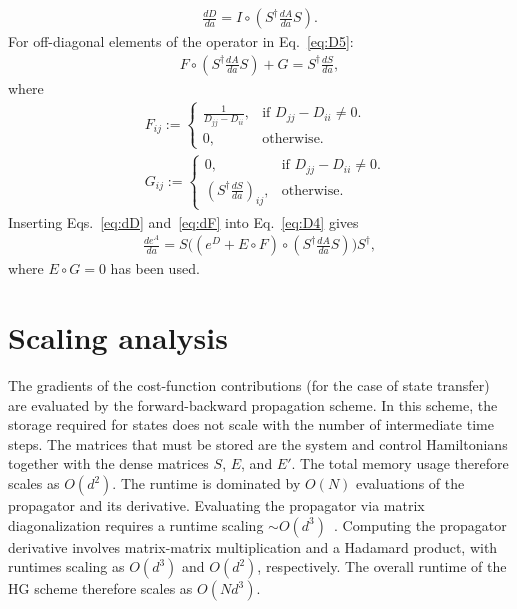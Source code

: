 \begin{appendices}
\begin{align}
\label{eq:dD}
    \frac{dD}{da}=I\circ (S^\dagger\frac{dA}{da}S).
\end{align}
For off-diagonal elements of the operator in Eq.~\eqref{eq:D5}:
\begin{align}
\label{eq:dF}
    F\circ (S^\dagger\frac{dA}{da}S)+G=S^\dagger\frac{dS}{da},
\end{align}
where
\begin{align}
    &F_{ij}:=
  \begin{cases}
    \frac{1}{D_{jj}-D_{ii}},& \text{if $D_{jj}-D_{ii} \neq 0$}.\\
    0, & \text{otherwise}.
  \end{cases}\\
\nonumber  &G_{ij}:=
  \begin{cases}
    0, & \text{if $D_{jj}-D_{ii} \neq 0$}.\\
    (S^\dagger\frac{dS}{da})_{ij}, & \text{otherwise}.
\end{cases}
\end{align}
Inserting Eqs.~\eqref{eq:dD} and~\eqref{eq:dF} into Eq.~\eqref{eq:D4} gives
\begin{align}
\label{eq:propagator_der}
    \frac{de^A}{da}=S\big((e^D+E \circ F)\circ(S^\dagger \frac{dA}{da}S)\big)S^\dagger,
\end{align}
where $E\circ G=0$ has been used.

\section{Scaling analysis}
\label{sec:app_scaling}

The gradients of the cost-function contributions (for the case of state transfer) are evaluated by the forward-backward propagation scheme. In this scheme, the storage required for states does not scale with the number of intermediate time steps. The matrices that must be stored are the system and control Hamiltonians together with the dense matrices $S$, $E$, and $E'$. The total memory usage therefore scales as $O(d^2)$. The runtime is dominated by $O(N)$ evaluations of the propagator and its derivative. Evaluating the propagator via matrix diagonalization requires a runtime scaling $\sim O(d^3)$~\cite{matridiagcomppan1999complexity}. Computing the propagator derivative involves matrix-matrix multiplication and a Hadamard product, with runtimes scaling as $O(d^3)$ and $O(d^2)$, respectively. The overall runtime of the HG scheme therefore scales as $O(Nd^3)$.


\end{appendices}
